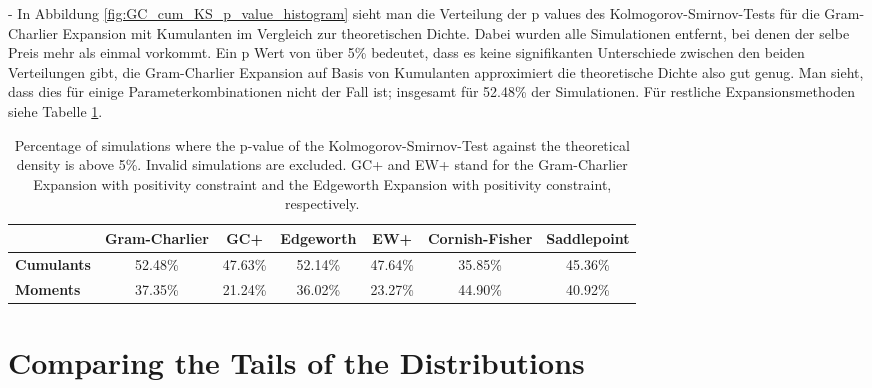 - In Abbildung \ref{fig:GC_cum_KS_p_value_histogram} sieht man die Verteilung der p values des Kolmogorov-Smirnov-Tests für die Gram-Charlier Expansion mit Kumulanten im Vergleich zur theoretischen Dichte. Dabei wurden alle Simulationen entfernt, bei denen der selbe Preis mehr als einmal vorkommt. Ein p Wert von über 5\% bedeutet, dass es keine signifikanten Unterschiede zwischen den beiden Verteilungen gibt, die Gram-Charlier Expansion auf Basis von Kumulanten approximiert die theoretische Dichte also gut genug. Man sieht, dass dies für einige Parameterkombinationen nicht der Fall ist; insgesamt für 52.48\% der Simulationen. Für restliche Expansionsmethoden siehe Tabelle \ref{tab:KS_p_value_percentage}.

\begin{table}[h]
    \centering
    \begin{tabular}{l|c|c|c|c|c|c}
        & \textbf{Gram-Charlier} & \textbf{GC+} & \textbf{Edgeworth} & \textbf{EW+} & \textbf{Cornish-Fisher} & \textbf{Saddlepoint} \\
        \hline
        \textbf{Cumulants} & 52.48\% & 47.63\% & 52.14\% & 47.64\% & 35.85\% & 45.36\% \\
        \textbf{Moments} & 37.35\% & 21.24\% & 36.02\% & 23.27\% & 44.90\% & 40.92\%
    \end{tabular}
    \caption{Percentage of simulations where the p-value of the Kolmogorov-Smirnov-Test against the theoretical density is above 5\%. Invalid simulations are excluded. GC+ and EW+ stand for the Gram-Charlier Expansion with positivity constraint and the Edgeworth Expansion with positivity constraint, respectively.}
    \label{tab:KS_p_value_percentage}
\end{table}

\section{Comparing the Tails of the Distributions}